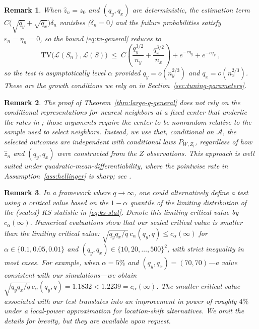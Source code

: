 \documentclass[11pt]{article}
\numberwithin{equation}{section}
\newtheorem{remark}{Remark}%
\begin{document}
\begin{remark}\label{rem:known-special}
When $\hat z_n=z_0$ and $(q_y,q_x)$ are deterministic, the estimation term $C\big(\sqrt{\bar q_y}+\sqrt{\bar q_x}\big)\delta_n$ vanishes ($\delta_n=0$) and the failure probabilities satisfy $\varepsilon_n=\eta_n=0$, so the bound \eqref{eq:tv-general} reduces to
\begin{equation}\label{eq:tv-known}
 \mathrm{TV}\big(\mathcal L(S_n),\mathcal L(S)\big) \;\le\; C\left(\frac{q_y^{3/2}}{n_y}+\frac{q_x^{3/2}}{n_x}\right)+e^{-cq_y}+e^{-cq_x}~,
\end{equation}
so the test is asymptotically level $\alpha$ provided $q_y=o(n_y^{2/3})$ and $q_x=o(n_x^{2/3})$. These are the growth conditions we rely on in Section~\ref{sec:tuning-parameters}. 
\end{remark}

\begin{remark}\label{rem:proof-method}
The proof of Theorem~\ref{thm:large-q-general} does not rely on the conditional representations for nearest neighbors at a fixed center that underlie the rates in \citet{bugni/canay/kim:26b}; those arguments require the center to be nonrandom relative to the sample used to select neighbors. 
Instead, we use that, conditional on $\mathcal A$, the selected outcomes are independent with conditional laws $P_{W,Z_i}$, regardless of how $\hat z_n$ and $(q_y,q_x)$ were constructed from the $Z$ observations. This approach is well suited under quadratic-mean-differentiability, where the pointwise rate in Assumption~\ref{ass:hellinger} is sharp; see \citet{bugni/canay/kim:26b}.
\end{remark}

\begin{remark}
In a framework where $q \to \infty$, one could alternatively define a test using a critical value based on the $1-\alpha$ quantile of the limiting distribution of the (scaled) KS statistic in \eqref{eq:ks-stat}. Denote this limiting critical value by $c_{\alpha}(\infty)$. Numerical evaluations show that our scaled critical value is smaller than the limiting critical value: $\sqrt{q_yq_x/q}\,c_{\alpha}(q_y,q) \le c_{\alpha}(\infty)$ for $\alpha \in \{0.1, 0.05, 0.01\}$ and $(q_y,q_x) \in \{10,20,\ldots,500\}^2$, with strict inequality in most cases. For example, when $\alpha=5\%$ and $(q_y,q_x) = (70,70)$---a value consistent with our simulations---we obtain $\sqrt{q_yq_x/q}\,c_{\alpha}(q_y,q) = 1.1832 < 1.2239 = c_{\alpha}(\infty)$. The smaller critical value associated with our test translates into an improvement in power of roughly $4\%$ under a local-power approximation for location-shift alternatives. We omit the details for brevity, but they are available upon request.
\end{remark}
\end{document}
